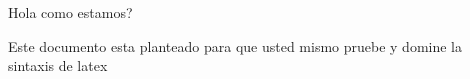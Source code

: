 \documentclass[a4paper]{article} %
\begin{document}
    \begin{titlepage}
    \centering
    Hola como estamos?
    
    Este documento esta planteado para que usted mismo
    pruebe y domine la sintaxis de latex
    \end{titlepage}
\end{document}
